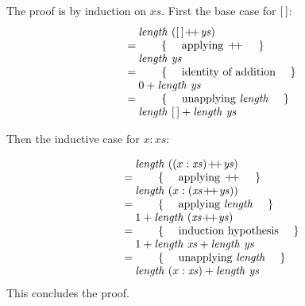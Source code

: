 \begin{parts}
\begin{solution}
        The proof is by induction on $\mathit{xs}$. First the base case for $\hslist{}$:
        \begin{displaymath}
        \begin{array}{cl}
        \expr{\mathit{length}~(\hslist{} \append \mathit{ys})}
        \hint{applying $\append$}
        \expr{\mathit{length}~\mathit{ys}}
        \hint{identity of addition}
        \expr{0 + \mathit{length}~\mathit{ys}}
        \hint{unapplying $\mathit{length}$}
        \lastexpr{\mathit{length}~\hslist{} + \mathit{length}~\mathit{ys}}
        \end{array}
        \end{displaymath}
        
        Then the inductive case for $x:\mathit{xs}$:
        
        \begin{displaymath}
        \begin{array}{cl}
        \expr{\mathit{length}~((x:\mathit{xs}) \append \mathit{ys})}
        \hint{applying $\append$}
        \expr{\mathit{length}~(x : (\mathit{xs} \append \mathit{ys}))}
        \hint{applying $\mathit{length}$}
        \expr{1 + \mathit{length}~(\mathit{xs} \append \mathit{ys})}
        \hint{induction hypothesis}
        \expr{1 + \mathit{length}~\mathit{xs} + \mathit{length}~\mathit{ys}}
        \hint{unapplying $\mathit{length}$}
        \lastexpr{\mathit{length}~(x:\mathit{xs}) + \mathit{length}~\mathit{ys}}
        \end{array}
        \end{displaymath}
        This concludes the proof.
    \end{solution}
    
\end{parts}
